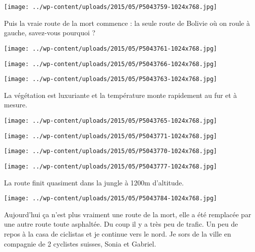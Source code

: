  \newline
\centerline{\texttt{[image: ../wp-content/uploads/2015/05/P5043759-1024x768.jpg]} } 
 \newline
 Puis la vraie route de la mort commence : la seule route de Bolivie où on roule à gauche, savez-vous pourquoi ? \newline
 \newline
\centerline{\texttt{[image: ../wp-content/uploads/2015/05/P5043761-1024x768.jpg]} } 
 \newline
 \newline
\centerline{\texttt{[image: ../wp-content/uploads/2015/05/P5043766-1024x768.jpg]} } 
 \newline
 \newline
\centerline{\texttt{[image: ../wp-content/uploads/2015/05/P5043763-1024x768.jpg]} } 
 \newline
 La végétation est luxuriante et la température monte rapidement au fur et à mesure. \newline
 \newline
\centerline{\texttt{[image: ../wp-content/uploads/2015/05/P5043765-1024x768.jpg]} } 
 \newline
 \newline
\centerline{\texttt{[image: ../wp-content/uploads/2015/05/P5043771-1024x768.jpg]} } 
 \newline
 \newline
\centerline{\texttt{[image: ../wp-content/uploads/2015/05/P5043770-1024x768.jpg]} } 
 \newline
 \newline
\centerline{\texttt{[image: ../wp-content/uploads/2015/05/P5043777-1024x768.jpg]} } 
 \newline
 La route finit quasiment dans la jungle à 1200m d'altitude. \newline
 \newline
\centerline{\texttt{[image: ../wp-content/uploads/2015/05/P5043784-1024x768.jpg]} } 
 \newline
 Aujourd'hui ça n'est plus vraiment une route de la mort, elle a été remplacée par une autre route toute asphaltée. Du coup il y a très peu de trafic. \newline
 Un peu de repos à la casa de ciclistas et je continue vers le nord. Je sors de la ville en compagnie de 2 cyclistes suisses, Sonia et Gabriel. \newline
